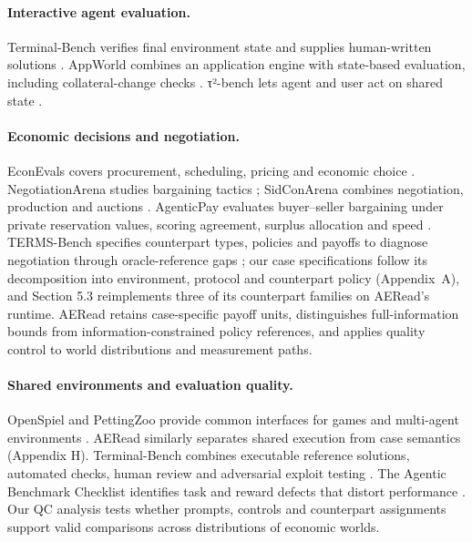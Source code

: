 \paragraph{Interactive agent evaluation.}
Terminal-Bench verifies final environment state and supplies human-written
solutions \citep{merrill2026terminalbench}. AppWorld combines an application
engine with state-based evaluation, including collateral-change checks
\citep{trivedi2024appworld}. τ²-bench lets agent and user act on shared
state \citep{barres2025tau2}.

\paragraph{Economic decisions and negotiation.}
EconEvals covers procurement, scheduling, pricing and economic choice
\citep{fish2025econevals}. NegotiationArena studies bargaining tactics
\citep{bianchi2024negotiationarena}; SidConArena combines negotiation,
production and auctions \citep{feng2026sidconarena}. AgenticPay evaluates
buyer--seller bargaining under private reservation values, scoring
agreement, surplus allocation and speed \citep{liu2026agenticpay}.
TERMS-Bench specifies counterpart types, policies and payoffs to diagnose
negotiation through oracle-reference gaps \citep{zhang2026termsbench}; our
case specifications follow its decomposition into environment, protocol
and counterpart policy (Appendix~A), and Section 5.3 reimplements three of
its counterpart families on AERead's runtime.
AERead retains case-specific payoff units, distinguishes full-information
bounds from information-constrained policy references, and applies quality control to world
distributions and measurement paths.

\paragraph{Shared environments and evaluation quality.}
OpenSpiel and PettingZoo provide common interfaces for games and
multi-agent environments \citep{lanctot2019openspiel,terry2021pettingzoo}.
AERead similarly separates shared execution from case semantics
(Appendix H). Terminal-Bench combines executable reference solutions,
automated checks, human review and adversarial exploit testing
\citep{merrill2026terminalbench}. The Agentic Benchmark Checklist
identifies task and reward defects that distort performance
\citep{zhu2025abc}. Our QC analysis tests whether prompts, controls and
counterpart assignments support valid comparisons across distributions
of economic worlds.

